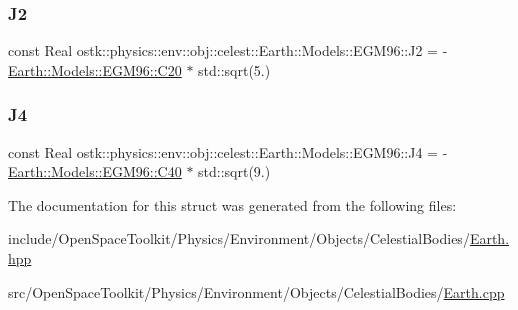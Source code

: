 \mbox{\label{structostk_1_1physics_1_1env_1_1obj_1_1celest_1_1_earth_1_1_models_1_1_e_g_m96_a304fd67c6142f1d6a0814647cbc90aad}} 
\subsubsection{\texorpdfstring{J2}{J2}}
{\footnotesize\ttfamily const Real ostk\+::physics\+::env\+::obj\+::celest\+::\+Earth\+::\+Models\+::\+E\+G\+M96\+::\+J2 = -\/\hyperlink{structostk_1_1physics_1_1env_1_1obj_1_1celest_1_1_earth_1_1_models_1_1_e_g_m96_a9ae4801d69fc8be4dcb24bc7496ff5b7}{Earth\+::\+Models\+::\+E\+G\+M96\+::\+C20} $\ast$ std\+::sqrt(5.)\hspace{0.3cm}{\ttfamily [static]}}

\mbox{\label{structostk_1_1physics_1_1env_1_1obj_1_1celest_1_1_earth_1_1_models_1_1_e_g_m96_a32895193b72cb896440cb4772c79ffbf}} 
\subsubsection{\texorpdfstring{J4}{J4}}
{\footnotesize\ttfamily const Real ostk\+::physics\+::env\+::obj\+::celest\+::\+Earth\+::\+Models\+::\+E\+G\+M96\+::\+J4 = -\/\hyperlink{structostk_1_1physics_1_1env_1_1obj_1_1celest_1_1_earth_1_1_models_1_1_e_g_m96_a0d1ffd77c12b97cfd85ce1b2970e5e1d}{Earth\+::\+Models\+::\+E\+G\+M96\+::\+C40} $\ast$ std\+::sqrt(9.)\hspace{0.3cm}{\ttfamily [static]}}



The documentation for this struct was generated from the following files\+:\begin{DoxyCompactItemize}
\item 
include/\+Open\+Space\+Toolkit/\+Physics/\+Environment/\+Objects/\+Celestial\+Bodies/\hyperlink{_objects_2_celestial_bodies_2_earth_8hpp}{Earth.\+hpp}\item 
src/\+Open\+Space\+Toolkit/\+Physics/\+Environment/\+Objects/\+Celestial\+Bodies/\hyperlink{_objects_2_celestial_bodies_2_earth_8cpp}{Earth.\+cpp}\end{DoxyCompactItemize}
